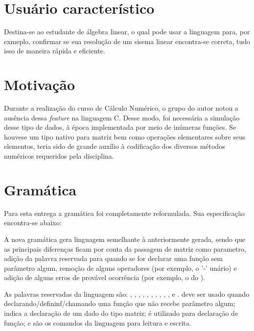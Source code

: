 \documentclass[
	article,			%
	11pt,				%
	oneside,			%
	a4paper,			%
	english,			%
	brazil,				%
	sumario=tradicional
	]{abntex2}
\renewcommand{\it}[1]{\textit{#1}}
\begin{document}
\section{Usuário característico}
Destina-se ao estudante de álgebra linear, o qual pode usar a linguagem para, por exmeplo, confirmar se sua resolução de um sisema linear encontra-se correta, tudo isso de maneira rápida e eficiente.

\section{Motivação}
Durante a realização do curso de Cálculo Numérico, o grupo do autor notou a ausência dessa \it{feature} na linguagem C. Desse modo, foi necessária a simulação desse tipo de dados, à época implementada por meio de inúmeras funções. Se houvese um tipo nativo para matriz bem como operações elementares sobre seus elementos, teria sido de grande auxílio à codificação dos diversos métodos numéricos requeridos pela disciplina.
\par


\section{Gramática}
Para esta entrega a gramática foi completamente reformulada. Sua especificação encontra-se abaixo:
	
A nova gramática gera linguagem semelhante à anteriormente gerada, sendo que as principais diferenças ficam por conta da passagem de matriz como parametro, adição da palavra reservada  para quando se for declarar uma função sem parâmetro algum, remoção de alguns operadores (por exemplo, o '-' unário) e adição de alguns erros de provável ocorrência (por exemplo, o  do ).

As palavras reservadas da linguagem são: , , , ,  , , , , , ,  e .
 deve ser usado quando declarando/defininf/chamando uma função que não recebe parâmetro algum;  indica a declaração de um dado do tipo matriz;  é utilizado para declaração de função;  e  são os comandos da linguagem para leitura e escrita.


\end{document}
